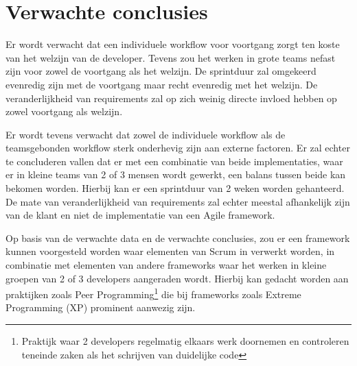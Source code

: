 \section{Verwachte conclusies}
\label{sec:verwachte_conclusies}

    
    Er wordt verwacht dat een individuele workflow voor voortgang zorgt ten koste van het welzijn van de developer. Tevens zou het werken in grote teams nefast zijn voor zowel de voortgang als het welzijn. De sprintduur zal omgekeerd evenredig zijn met de voortgang maar recht evenredig met het welzijn. De veranderlijkheid van requirements zal op zich weinig directe invloed hebben op zowel voortgang als welzijn.
    
    Er wordt tevens verwacht dat zowel de individuele workflow als de teamsgebonden workflow sterk onderhevig zijn aan externe factoren. Er zal echter te concluderen vallen dat er met een combinatie van beide implementaties, waar er in kleine teams van 2 of 3 mensen wordt gewerkt, een balans tussen beide kan bekomen worden. Hierbij kan er een sprintduur van 2 weken worden gehanteerd. De mate van veranderlijkheid van requirements zal echter meestal afhankelijk zijn van de klant en niet de implementatie van een Agile framework.
    
    Op basis van de verwachte data en de verwachte conclusies, zou er een framework kunnen voorgesteld worden waar elementen van Scrum in verwerkt worden, in combinatie met elementen van andere frameworks waar het werken in kleine groepen van 2 of 3 developers aangeraden wordt. Hierbij kan gedacht worden aan praktijken zoals Peer Programming\footnote{Praktijk waar 2 developers regelmatig elkaars werk doornemen en controleren teneinde zaken als het schrijven van duidelijke code} die bij frameworks zoals Extreme Programming (XP) prominent aanwezig zijn.
